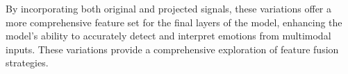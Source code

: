\documentclass[11pt]{article}
\begin{document}
By incorporating both original and projected signals, these variations offer a more comprehensive feature set for the final layers of the model, enhancing the model's ability to accurately detect and interpret emotions from multimodal inputs. These variations provide a comprehensive exploration of feature fusion strategies.

\end{document}

